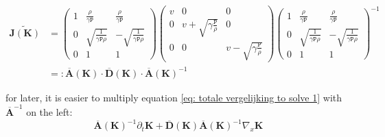 \documentclass[a4paper]{article}
\begin{document}
\begin{equation*}
\begin{split}
	\widetilde{\mathbf{J(K)}} & = \left(\begin{matrix}
	1 &  \frac{\rho}{\gamma\mathtt{P}} &  \frac{\rho}{\gamma\mathtt{P}} \\
	0 &  \sqrt{\frac{1}{\gamma\mathtt{P}\rho}} & -\sqrt{\frac{1}{\gamma\mathtt{P}\rho}}\\
	0 & 1 & 1
	\end{matrix}\right) \left(\begin{matrix}
	v &  0 &  0 \\
	0 &   v + \sqrt{\gamma\frac{ \mathtt{P}}{\rho}}  & 0\\
	0 & 0 &  v - \sqrt{\gamma\frac{ \mathtt{P}}{\rho}}
	\end{matrix}\right) 
	\left(\begin{matrix}
	1 &  \frac{\rho}{\gamma\mathtt{P}} &  \frac{\rho}{\gamma\mathtt{P}} \\
	0 &  \sqrt{\frac{1}{\gamma\mathtt{P}\rho}} & -\sqrt{\frac{1}{\gamma\mathtt{P}\rho}}\\
	0 & 1 & 1
	\end{matrix}\right)^{-1}\\
	& =:  \overline{\textbf{A}}\mathbf{(K)} \cdot \overline{\textbf{D}}\mathbf{(K)}\cdot \overline{\textbf{A}}\mathbf{(K)}^{-1}
\end{split}
\end{equation*}

for later, it is easier to multiply equation \ref{eq: totale vergelijking to solve 1} with  $\overline{\textbf{A}}^{-1}$ on the left: \begin{equation}
	\overline{\textbf{A}}\mathbf{(K)}^{-1} \partial_t \mathbf{K} + \overline{\textbf{D}}\mathbf{(K)} \overline{\textbf{A}}\mathbf{(K)}^{-1}  \nabla_x\mathbf{K}
\end{equation}
\end{document}
